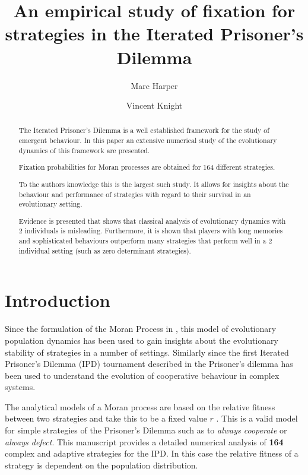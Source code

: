 \documentclass{article}
\title{An empirical study of fixation for strategies in the
       Iterated Prisoner's Dilemma}
\author{Marc Harper \and Vincent Knight} %
\date{}
\begin{document}
\maketitle

\begin{abstract}
    The Iterated Prisoner's Dilemma is a well established framework for
    the study of emergent behaviour. In this paper an extensive numerical
    study of the evolutionary dynamics of this framework are presented.

    Fixation probabilities for Moran processes are obtained for 164
    different strategies.

    To the authors knowledge this is the largest
    such study. It allows for insights about the behaviour and
    performance of strategies with regard to their survival in an
    evolutionary setting.

    Evidence is presented that shows that classical analysis of evolutionary
    dynamics with 2 individuals is misleading. Furthermore, it is shown that
    players with long memories and sophisticated behaviours outperform many
    strategies that perform well in a 2 individual setting (such as zero
    determinant strategies).

\end{abstract}

\section{Introduction}\label{sec:introduction}

Since the formulation of the Moran Process in \cite{Moran1957}, this model of
evolutionary population dynamics has been used to gain insights about the
evolutionary stability of strategies in a number of settings. Similarly since
the first Iterated Prisoner's Dilemma (IPD) tournament described in
\cite{Axelrod1980a} the Prisoner's dilemma has been used to understand the
evolution of cooperative behaviour in complex systems.

The analytical models of a Moran process are based on the relative fitness
between two strategies and take this to be a fixed value \(r\) \cite{Nowak}.
This is a valid model for simple strategies of the Prisoner's Dilemma such as to
\textit{always cooperate} or \textit{always defect}. This manuscript provides a
detailed numerical analysis of \textbf{164} complex and adaptive strategies for
the IPD\@. In this case the relative fitness of a strategy is dependent on the
population distribution.
\end{document}
